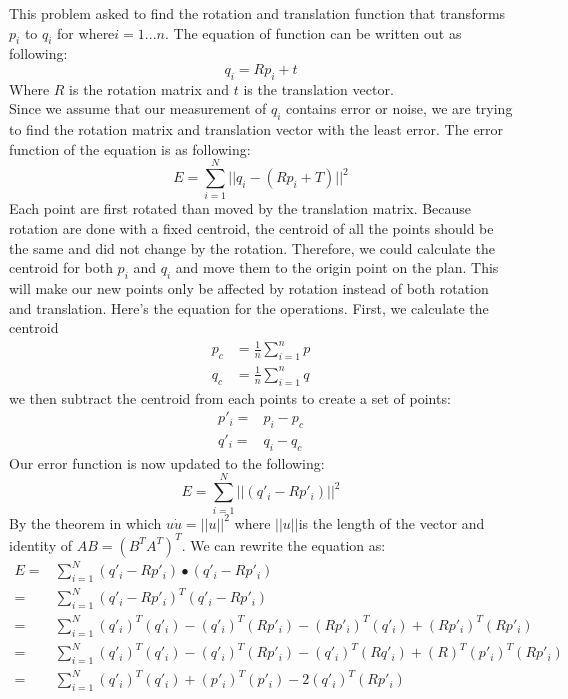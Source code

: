 \documentclass{article}
\begin{document}
This problem asked to find the rotation and translation function that transforms $p_i$ to $q_i$ for where$i = 1 ... n$. The equation of function can be written out as following:
\begin{equation*}
q_i = Rp_i + t
\end{equation*}
Where $R$ is the rotation matrix and $t$ is the translation vector.\\
Since we assume that our measurement of $q_i$ contains error or noise, we are trying to find the rotation matrix and translation vector with the least error. The error function of the equation is as following:
\begin{equation*}
E = \sum_{i = 1}^{N}||q_i - (Rp_i + T)||^2
\end{equation*}
Each point are first rotated than moved by the translation matrix. Because rotation are done with a fixed centroid, the centroid of all the points should be the same and did not change by the rotation. Therefore, we could calculate the centroid for both $p_i$ and $q_i$ and move them to the origin point on the plan. This will make our new points only be affected by rotation instead of both rotation and translation. Here's the equation for the operations. First, we calculate the centroid\\
\begin{equation*}
\begin{aligned}
p_c &= \frac{1}{n}\sum_{i=1}^{n}p\\
q_c &= \frac{1}{n}\sum_{i=1}^{n}q
\end{aligned}
\end{equation*}
we then subtract the centroid from each points to create a set of points:
\begin{equation*}
\begin{aligned}
p'_i =& p_i - p_c\\
q'_i =& q_i - q_c
\end{aligned}
\end{equation*}
Our error function is now updated to the following:
\begin{equation*}
E = \sum_{i = 1}^{N}||(q'_i - Rp'_i)||^2
\end{equation*}
By the theorem in which $u \dot u = ||u||^2$ where $||u||$is the length of the vector and identity of $AB = (B^TA^T)^T$. We can rewrite the equation as:
\begin{equation*}
\begin{aligned}
E =& \sum_{i = 1}^{N}(q'_i - Rp'_i) \bullet (q'_i - Rp'_i)\\
=& \sum_{i = 1}^{N}(q'_i - Rp'_i)^{T}(q'_i - Rp'_i)\\
=& \sum_{i = 1}^{N}(q'_i)^T(q'_i) - (q'_i)^T(Rp'_i) - (Rp'_i)^T(q'_i) + (Rp'_i)^T(Rp'_i)\\
=& \sum_{i = 1}^{N}(q'_i)^T(q'_i) - (q'_i)^T(Rp'_i) - (q'_i)^T(Rq'_i) + (R)^T(p'_i)^T(Rp'_i)\\
=& \sum_{i = 1}^{N}(q'_i)^T(q'_i) + (p'_i)^T(p'_i) - 2(q'_i)^T(Rp'_i)
\end{aligned}
\end{equation*}
\end{document}
